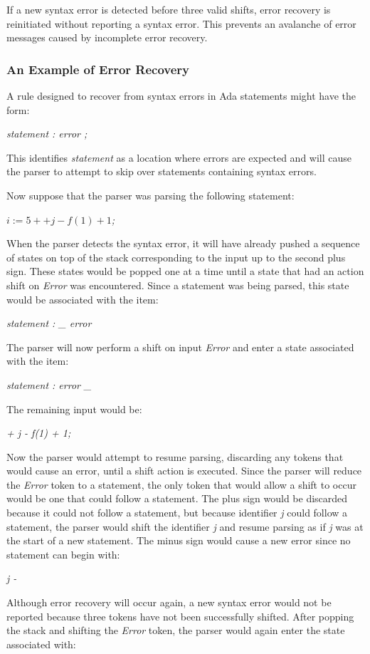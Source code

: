 If a new syntax error is detected before three valid shifts,
error recovery is reinitiated without reporting a syntax error.  This
prevents an avalanche of error messages caused by incomplete
error recovery.
\subsubsection{An Example of Error Recovery}
A rule designed to recover from syntax errors in Ada statements might
have the form:

\centerline{{\it statement : error ;}}

This identifies
{\it statement}
as a location where errors are expected and will cause the parser to
attempt to skip over statements containing syntax errors.

Now suppose that the parser was parsing the following statement:

\centerline{{\it$i := 5 + + j - f(1) + 1$;}}

When the parser detects the syntax error,  it will have already
pushed a sequence of states on top of the stack corresponding
to the input up to the second plus sign.  These states would
be popped one at a time until a state that had an action shift on
{\it Error}
was encountered.  Since a statement was being parsed, this
state would be associated with the item:

\centerline{{\it statement : \_ error}}

The parser will now perform a shift on input
{\it Error}
and enter a state associated with the item:

\centerline{\it statement : error \_}

The remaining input would be:

\centerline{\it + j - f(1) + 1;}

Now the parser would attempt to resume parsing, discarding any
tokens that would cause an error, until a shift action is
executed.  Since the parser will reduce the
{\it Error}
token to a statement, the only token that would allow a shift to
occur would be one that could follow a statement.  The plus sign
would be discarded because it could not follow a statement,
but because identifier
{\it j}
could follow a statement,
the parser would shift the identifier
{\it j}
and resume parsing as if
{\it j}
was at the start of a new statement.  The minus sign
would cause a new error since no statement can begin with:

\centerline{\it j -}

Although error recovery will occur again, a new syntax error would not
be reported because three tokens have not been successfully shifted.  After
popping the stack and shifting the
{\it Error}
token,
the parser would again enter the state associated with:

